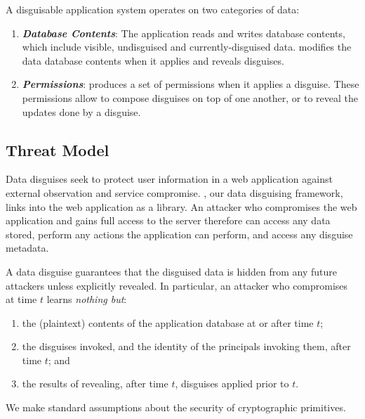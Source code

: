 \noindent
A disguisable application system operates on two categories of data:
\begin{enumerate}
    \item \emph{\textbf{Database Contents}}: The application reads and writes database
        contents, which include visible, undisguised and currently-disguised data.
        \sys modifies the data database contents when it applies and reveals disguises.
    \item \emph{\textbf{Permissions}}: \sys produces a set of permissions when it applies a
        disguise. These permissions allow \sys to compose disguises on top of one another, or to
        reveal the updates done by a disguise.
\end{enumerate}

\subsection{Threat Model}

%
Data disguises seek to protect user information in a web application against external observation
and service compromise.
%
\sys, our data disguising framework, links into the web application as a library.
%
An attacker who compromises the web application and gains full access to the server therefore
can access any data stored, perform any actions the application can perform, and access any
disguise metadata.
%

%
A data disguise guarantees that the disguised data is hidden from any future attackers unless
explicitly revealed.
%
In particular, an attacker who compromises \sys at time $t$ learns \emph{nothing but}:
\begin{enumerate}[nosep]
  \item the (plaintext) contents of the application database at or after time $t$;
  \item the disguises invoked, and the identity of the principals invoking them, after time $t$; and
  \item the results of revealing, after time $t$, disguises applied prior to $t$.
\end{enumerate}
%
We make standard assumptions about the security of cryptographic primitives.
%

